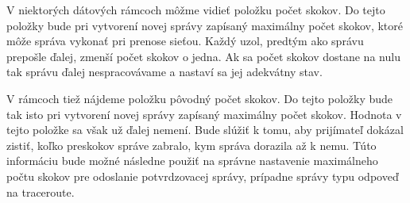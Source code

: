 \documentclass[slovak,master]{diploma}
\begin{document}
\begin{table}[h!]
  \centering
  \qquad
  \caption{Štruktúra dátového rámcu pre správy typu traceroute.}
  \label{tab:trFrames}
\end{table}

V niektorých dátových rámcoch môžme vidieť položku počet skokov. Do tejto položky bude pri vytvorení novej správy zapísaný maximálny počet skokov, ktoré môže správa vykonať 
pri prenose sieťou. Každý uzol, predtým ako správu prepošle ďalej, zmenší počet skokov o jedna. Ak sa počet skokov dostane na nulu tak správu ďalej nespracovávame a nastaví sa jej 
adekvátny stav.

V rámcoch tiež nájdeme položku pôvodný počet skokov. Do tejto položky bude tak isto pri vytvorení novej správy zapísaný maximálny počet skokov. Hodnota v tejto položke sa 
však už ďalej nemení. Bude slúžiť k tomu, aby prijímateľ dokázal zistiť, koľko preskokov správe zabralo, kym správa dorazila až k nemu. Túto informáciu bude možné 
následne použiť na správne nastavenie maximálneho počtu skokov pre odoslanie potvrdzovacej správy, prípadne správy typu odpoveď na traceroute.

\begin{table}[h!]
  \centering
  \qquad
  \caption{Štruktúra dátového rámcu pre ACK a senzorové správy.}
  \label{tab:frames}
\end{table}
\end{document}
